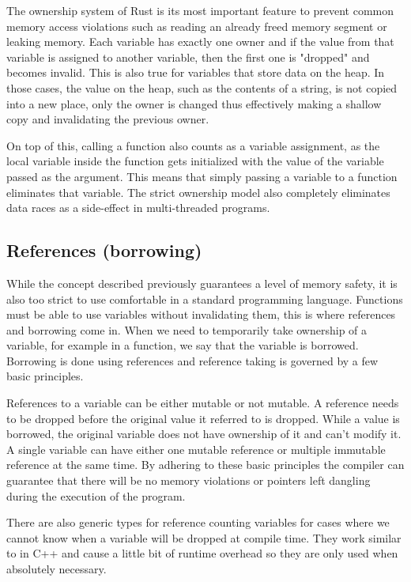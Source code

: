 The ownership system of Rust is its most important feature to prevent common memory access violations such as reading an already freed memory segment or leaking memory. Each variable has exactly one owner and if the value from that variable is assigned to another variable, then the first one is "dropped" and becomes invalid. This is also true for variables that store data on the heap. In those cases, the value on the heap, such as the contents of a string, is not copied into a new place, only the owner is changed thus effectively making a shallow copy and invalidating the previous owner.

On top of this, calling a function also counts as a variable assignment, as the local variable inside the function gets initialized with the value of the variable passed as the argument. This means that simply passing a variable to a function eliminates that variable. The strict ownership model also completely eliminates data races as a side-effect in multi-threaded programs.

\subsection{References (borrowing)}

While the concept described previously guarantees a level of memory safety, it is also too strict to use comfortable in a standard programming language. Functions must be able to use variables without invalidating them, this is where references and borrowing come in. When we need to temporarily take ownership of a variable, for example in a function, we say that the variable is borrowed. Borrowing is done using references and reference taking is governed by a few basic principles.

References to a variable can be either mutable or not mutable. A reference needs to be dropped before the original value it referred to is dropped. While a value is borrowed, the original variable does not have ownership of it and can't modify it. A single variable can have either one mutable reference or multiple immutable reference at the same time. By adhering to these basic principles the compiler can guarantee that there will be no memory violations or pointers left dangling during the execution of the program.

There are also generic types for reference counting variables for cases where we cannot know when a variable will be dropped at compile time. They work similar to  in C++ and cause a little bit of runtime overhead so they are only used when absolutely necessary.

